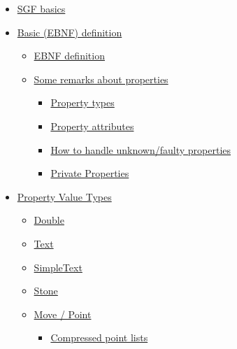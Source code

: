 \begin{itemize}
\tightlist
\item
  \href{https://red-bean.com/sgf/sgf4.html\#1}{SGF basics}
\item
  \href{https://red-bean.com/sgf/sgf4.html\#2}{Basic (EBNF) definition}

  \begin{itemize}
  \tightlist
  \item
    \href{https://red-bean.com/sgf/sgf4.html\#ebnf-def}{EBNF definition}
  \item
    \href{https://red-bean.com/sgf/sgf4.html\#2.2}{Some remarks about
    properties}

    \begin{itemize}
    \tightlist
    \item
      \href{https://red-bean.com/sgf/sgf4.html\#2.2.1}{Property types}
    \item
      \href{https://red-bean.com/sgf/sgf4.html\#2.2.2}{Property
      attributes}
    \item
      \href{https://red-bean.com/sgf/sgf4.html\#2.2.3}{How to handle
      unknown/faulty properties}
    \item
      \href{https://red-bean.com/sgf/sgf4.html\#2.2.4}{Private
      Properties}
    \end{itemize}
  \end{itemize}
\item
  \href{https://red-bean.com/sgf/sgf4.html\#types}{Property Value Types}

  \begin{itemize}
  \tightlist
  \item
    \href{https://red-bean.com/sgf/sgf4.html\#double}{Double}
  \item
    \href{https://red-bean.com/sgf/sgf4.html\#text}{Text}
  \item
    \href{https://red-bean.com/sgf/sgf4.html\#simpletext}{SimpleText}
  \item
    \href{https://red-bean.com/sgf/sgf4.html\#stone}{Stone}
  \item
    \href{https://red-bean.com/sgf/sgf4.html\#move/pos}{Move / Point}

    \begin{itemize}
    \tightlist
    \item
      \href{https://red-bean.com/sgf/sgf4.html\#3.5.1}{Compressed point
      lists}
    \end{itemize}
  \end{itemize}
\end{itemize}

